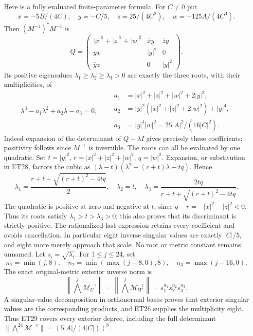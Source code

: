 Here is a fully evaluated finite-parameter formula. For $C\ne0$ put
\[
 x=-5B/(4C),\quad y=-C/5,\quad z=25/(4C^2),\quad w=-125A/(4C^3).
\]
Then $(M^{-1})^*M^{-1}$ is
\[
 Q=\begin{pmatrix}
 |x|^2+|z|^2+|w|^2&\bar x y&\bar z y\\
 \bar y x&|y|^2&0\\
 \bar y z&0&|y|^2
 \end{pmatrix}.
 \tag{ET27}
\]
Its positive eigenvalues $\lambda_1\ge\lambda_2\ge\lambda_3>0$
are exactly the three roots, with their multiplicities, of
\[
 \lambda^3-a_1\lambda^2+a_2\lambda-a_3=0,\qquad
 \begin{aligned}
 a_1&=|x|^2+|z|^2+|w|^2+2|y|^2,\\
 a_2&=|y|^2(|x|^2+|z|^2+2|w|^2)+|y|^4,\\
 a_3&=|y|^4|w|^2=25|A|^2/(16|C|^2).
 \end{aligned}
 \tag{ET28}
\]
Indeed expansion of the determinant of $Q-\lambda I$ gives precisely
these coefficients; positivity follows since $M^{-1}$ is invertible.
The roots can all be evaluated by one quadratic. Set
$t=|y|^2$, $r=|x|^2+|z|^2+|w|^2$, $q=|w|^2$.
Expansion, or substitution in ET28, factors the cubic as
$(\lambda-t)(\lambda^2-(r+t)\lambda+tq)$. Hence
\[
 \lambda_1=\frac{r+t+\sqrt{(r+t)^2-4tq}}2,\quad
 \lambda_2=t,\quad
 \lambda_3=\frac{2tq}{r+t+\sqrt{(r+t)^2-4tq}} .
 \tag{ET28a}
\]
The quadratic is positive at zero and negative at $t$, since
$q-r=-|x|^2-|z|^2<0$. Thus its roots satisfy
$\lambda_1>t>\lambda_3>0$; this also proves that its discriminant
is strictly positive. The rationalized last expression retains every
coefficient and avoids cancellation. In particular eight inverse
singular values are exactly $|C|/5$, and eight more merely approach
that scale. No root or metric constant remains unnamed.
Let $s_i=\sqrt{\lambda_i}$. For $1\le j\le24$, set
\[
 n_1=\min(j,8),\quad n_2=\min(\max(j-8,0),8),\quad
 n_3=\max(j-16,0).
\]
The exact original-metric exterior inverse norm is
\[
 \left\|\bigwedge^j\mathcal M_U^{-1}\right\|
 =\left\|\bigwedge^j\mathcal M_W^{-1}\right\|
 =s_1^{n_1}s_2^{n_2}s_3^{n_3}.
 \tag{ET29}
\]
A singular-value decomposition in orthonormal bases proves that
exterior singular values are the corresponding products, and ET26
supplies the multiplicity eight. Thus ET29 covers every exterior degree,
including the full determinant
$\|\bigwedge^{24}\mathcal M^{-1}\|=(5|A|/(4|C|))^8$.


